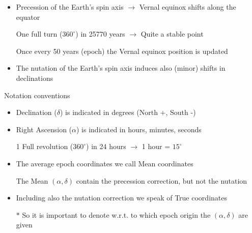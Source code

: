 \Tr
\begin{itemize}
\item Precession of the Earth's spin axis $\rightarrow$ Vernal equinox shifts along the equator
\item[] One full turn ($360^{\circ}$) in 25770 years $\rightarrow$ Quite a stable point
\item[] Once every 50 years (epoch) the Vernal equinox position is updated
\item The nutation of the Earth's spin axis induces also (minor) shifts in declinations
\end{itemize}
%
\begin{center}
{\red Notation conventions}
\end{center}
%
\begin{itemize}
\item {\blue Declination ($\delta$)} is indicated in degrees (North +, South -)
\item {\blue Right Ascension ($\alpha$)} is indicated in hours, minutes, seconds
\item[] 1 Full revolution ($360^{\circ}$) in 24 hours $\rightarrow$ 1 hour = $15^{\circ}$
\item The average epoch coordinates we call {\blue Mean coordinates}
\item[] The Mean $(\alpha,\delta)$ contain the precession correction, but not the nutation
\item Including also the nutation correction we speak of {\blue True coordinates}
\item[$\ast$] So it is important to denote w.r.t. to which epoch origin the $(\alpha,\delta)$ are given
\end{itemize}

